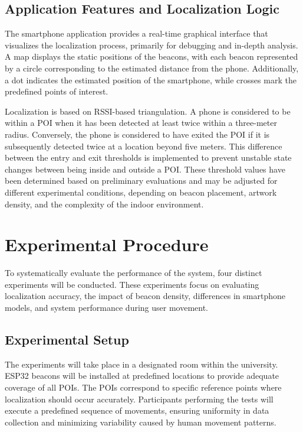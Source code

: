 \subsection{Application Features and Localization Logic}

The smartphone application provides a real-time graphical interface that visualizes the localization process, primarily for debugging and in-depth analysis. A map displays the static positions of the beacons, with each beacon represented by a circle corresponding to the estimated distance from the phone. Additionally, a dot indicates the estimated position of the smartphone, while crosses mark the predefined points of interest.

Localization is based on RSSI-based triangulation. A phone is considered to be within a POI when it has been detected at least twice within a three-meter radius. Conversely, the phone is considered to have exited the POI if it is subsequently detected twice at a location beyond five meters. This difference between the entry and exit thresholds is implemented to prevent unstable state changes between being inside and outside a POI. These threshold values have been determined based on preliminary evaluations and may be adjusted for different experimental conditions, depending on beacon placement, artwork density, and the complexity of the indoor environment.

\section{Experimental Procedure}

To systematically evaluate the performance of the system, four distinct experiments will be conducted. These experiments focus on evaluating localization accuracy, the impact of beacon density, differences in smartphone models, and system performance during user movement.

\subsection{Experimental Setup}

The experiments will take place in a designated room within the university. ESP32 beacons will be installed at predefined locations to provide adequate coverage of all POIs. The POIs correspond to specific reference points where localization should occur accurately. Participants performing the tests will execute a predefined sequence of movements, ensuring uniformity in data collection and minimizing variability caused by human movement patterns.

